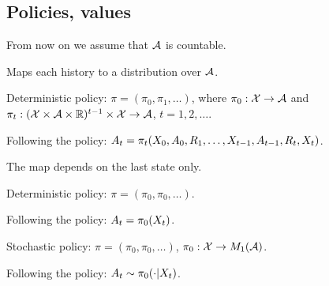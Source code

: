 \subsection{Policies, values}
{
\begin{Note}
From now on we assume that $\mathcal{A}$ is countable.
\end{Note}

\begin{Definition}
Maps each history to a distribution over $\mathcal{A}$.

\noindent Deterministic policy:
$\pi = (\pi_0,\pi_1,\ldots)$, where
 $\pi_0:\mathcal{X} \rightarrow \mathcal{A}$
 and $\pi_t : (\mathcal{X} \times \mathcal{A}\times \mathbb R)^{t-1} \times \mathcal{X} \rightarrow \mathcal{A}$, $t=1,2,\ldots$.
 
 \noindent Following the policy:
 $A_t = \pi_t(X_0,A_0,R_1,\ldots,X_{t-1},A_{t-1},R_t,X_t)$.
\end{Definition}


}
{
\begin{Definition}
The map depends on the last state only.
\bi
\item
\alert{Deterministic policy}:
$\pi = (\pi_0,\pi_0,\ldots)$.
\item[]
 Following the policy:
 $A_t = \pi_0(X_t)$.
\item
\alert{Stochastic policy}:
$\pi = (\pi_0,\pi_0,\ldots)$, $\pi_0: \mathcal{X} \rightarrow M_1(\mathcal{A})$.
\item[] Following the policy:
$A_t \sim \pi_0(\cdot|X_t)$.
\ei
\end{Definition}


}

